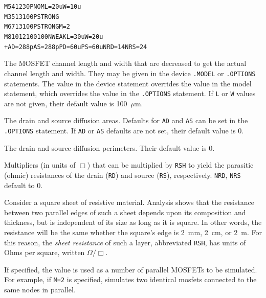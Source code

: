 \begin{Device}
\examples
\begin{alltt}
M5 4 12 3 0 PNOM L=20u W=10u
M3 5 13 10 0 PSTRONG
M6 7 13 10 0 PSTRONG M=2
M8 10 12 100 100 NWEAK L=30u W=20u
+ AD=288p AS=288p PD=60u PS=60u NRD=14 NRS=24
\end{alltt}

\parameters

\begin{Parameters}


The MOSFET channel length and width that are decreased to get the actual
channel length and width. They may be given in the device
\texttt{.MODEL} or \texttt{.OPTIONS} statements. The value in the device
statement overrides the value in the model statement, which overrides
the value in the \texttt{.OPTIONS} statement. If \texttt{L} or \texttt{W}
values are not given, their default value is 100~$\mu$m.


The drain and source diffusion areas. Defaults for \texttt{AD} and
\texttt{AS} can be set in the \texttt{.OPTIONS} statement.  If
\texttt{AD} or \texttt{AS} defaults are not set, their default value is
0.

The drain and source diffusion perimeters. Their default value is 0.


Multipliers (in units of $\Box$) that can be multiplied by \texttt{RSH}
to yield the parasitic (ohmic) resistances of the drain (\texttt{RD})
and source (\texttt{RS}), respectively.  \texttt{NRD}, \texttt{NRS}
default to 0.

Consider a square sheet of resistive material. Analysis shows that the
resistance between two parallel edges of such a sheet depends upon its
composition and thickness, but is independent of its size as long as it is
square. In other words, the resistance will be the same whether the square's
edge is 2~mm, 2~cm, or 2~m. For this reason, the \emph{sheet resistance} of
such a layer, abbreviated \texttt{RSH}, has units of Ohms per square,
written $\mathsf{\Omega}/\Box$.


If specified, the value is used as a number of parallel MOSFETs to be
simulated.  For example, if \texttt{M=2} is specified, \Xyce{} simulates two
identical mosfets connected to the same nodes in parallel.


\end{Parameters}
\end{Device}
